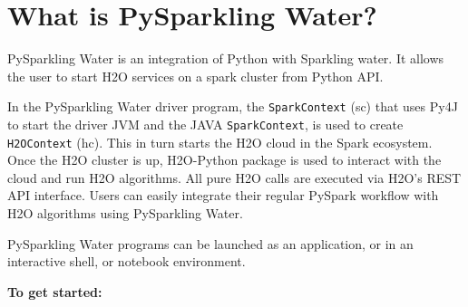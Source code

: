 \section{What is PySparkling Water?}

PySparkling Water is an integration of Python with Sparkling water. It allows the user to start H2O services on a spark cluster from Python API.

In the PySparkling Water driver program, the \texttt{SparkContext} (sc) that uses Py4J to start the driver JVM and the JAVA \texttt{SparkContext}, is used to create \texttt{H2OContext} (hc).  This in turn starts the H2O cloud in the Spark ecosystem. Once the H2O cluster is up, H2O-Python package is used to interact with the cloud and run H2O algorithms. All pure H2O calls are executed via H2O's REST API interface. Users can easily integrate their regular PySpark workflow with H2O algorithms using PySparkling Water.

PySparkling Water programs can be launched as an application, or in an interactive shell, or notebook environment.

\textbf{To get started:}

